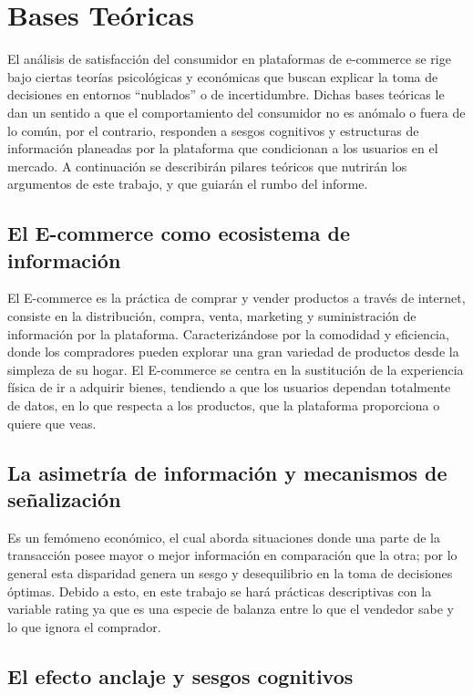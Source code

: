 \documentclass[oneside,11pt]{Latex/Classes/PhDthesisPSnPDF}
\begin{document}
\section{Bases Teóricas}

El análisis de satisfacción del consumidor en plataformas de e-commerce
se rige bajo ciertas teorías psicológicas y económicas que buscan
explicar la toma de decisiones en entornos ``nublados'' o de
incertidumbre. Dichas bases teóricas le dan un sentido a que el
comportamiento del consumidor no es anómalo o fuera de lo común, por el
contrario, responden a sesgos cognitivos y estructuras de información
planeadas por la plataforma que condicionan a los usuarios en el
mercado. A continuación se describirán pilares teóricos que nutrirán los
argumentos de este trabajo, y que guiarán el rumbo del informe.\\

\subsection{El E-commerce como ecosistema de información}

El E-commerce es la práctica de comprar y vender productos a través de
internet, consiste en la distribución, compra, venta, marketing y
suministración de información por la plataforma. Caracterizándose por la
comodidad y eficiencia, donde los compradores pueden explorar una gran
variedad de productos desde la simpleza de su hogar. El E-commerce se
centra en la sustitución de la experiencia física de ir a adquirir
bienes, tendiendo a que los usuarios dependan totalmente de datos, en lo
que respecta a los productos, que la plataforma proporciona o quiere que
veas.

\subsection{La asimetría de información y mecanismos de señalización}

Es un femómeno económico, el cual aborda situaciones donde una parte de
la transacción posee mayor o mejor información en comparación que la
otra; por lo general esta disparidad genera un sesgo y desequilibrio en
la toma de decisiones óptimas. Debido a esto, en este trabajo se hará
prácticas descriptivas con la variable rating ya que es una especie de
balanza entre lo que el vendedor sabe y lo que ignora el comprador.

\subsection{El efecto anclaje y sesgos cognitivos}
\end{document}
